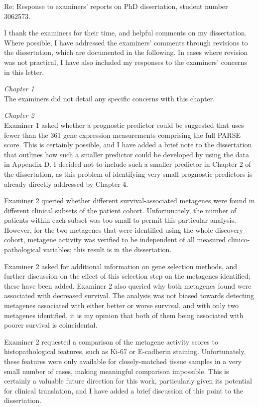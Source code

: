 \documentclass[a4paper,12pt,stdletter,sigleft]{newlfm}
\begin{document}
\begin{newlfm}

Re: Response to examiners' reports on PhD dissertation, student number 3062573.

I thank the examiners for their time, and helpful comments on my dissertation.  Where possible, I have addressed the examiners' comments through revisions to the dissertation, which are documented in the following.  In cases where revision was not practical, I have also included my responses to the examiners' concerns in this letter.

\emph{Chapter 1} \\
The examiners did not detail any specific concerns with this chapter.

\emph{Chapter 2} \\
Examiner 1 asked whether a prognostic predictor could be suggested that uses fewer than the 361 gene expression measurements comprising the full PARSE score.  This is certainly possible, and I have added a brief note to the dissertation that outlines how such a smaller predictor could be developed by using the data in Appendix D.  I decided not to include such a smaller predictor in Chapter 2 of the dissertation, as this problem of identifying very small prognostic predictors is already directly addressed by Chapter 4.

Examiner 2 queried whether different survival-associated metagenes were found in different clinical subsets of the patient cohort.  Unfortunately, the number of patients within each subset was too small to permit this particular analysis.  However, for the two metagenes that were identified using the whole discovery cohort, metagene activity was verified to be independent of all measured clinico-pathological variables; this result is in the dissertation.

Examiner 2 asked for additional information on gene selection methods, and further discussion on the effect of this selection step on the metagenes identified; these have been added.  Examiner 2 also queried why both metagenes found were associated with decreased survival.  The analysis was not biased towards detecting metagenes associated with either better or worse survival, and with only two metagenes identified, it is my opinion that both of them being associated with poorer survival is coincidental.

Examiner 2 requested a comparison of the metagene activity scores to histopathological features, such as Ki-67 or E-cadherin staining.  Unfortunately, these features were only available for closely-matched tissue samples in a very small number of cases, making meaningful comparison impossible.  This is certainly a valuable future direction for this work, particularly given its potential for clinical translation, and I have added a brief discussion of this point to the dissertation.


\end{newlfm}
\end{document}
